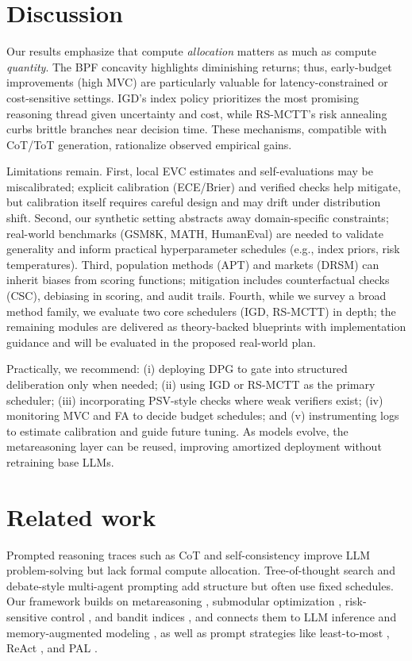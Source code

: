 \section{Discussion}

Our results emphasize that compute \emph{allocation} matters as much as compute \emph{quantity}. The BPF concavity highlights diminishing returns; thus, early-budget improvements (high MVC) are particularly valuable for latency-constrained or cost-sensitive settings. IGD’s index policy prioritizes the most promising reasoning thread given uncertainty and cost, while RS-MCTT’s risk annealing curbs brittle branches near decision time. These mechanisms, compatible with CoT/ToT generation, rationalize observed empirical gains.

Limitations remain. First, local EVC estimates and self-evaluations may be miscalibrated; explicit calibration (ECE/Brier) and verified checks help mitigate, but calibration itself requires careful design and may drift under distribution shift. Second, our synthetic setting abstracts away domain-specific constraints; real-world benchmarks (GSM8K, MATH, HumanEval) are needed to validate generality and inform practical hyperparameter schedules (e.g., index priors, risk temperatures). Third, population methods (APT) and markets (DRSM) can inherit biases from scoring functions; mitigation includes counterfactual checks (CSC), debiasing in scoring, and audit trails. Fourth, while we survey a broad method family, we evaluate two core schedulers (IGD, RS-MCTT) in depth; the remaining modules are delivered as theory-backed blueprints with implementation guidance and will be evaluated in the proposed real-world plan.

Practically, we recommend: (i) deploying DPG to gate into structured deliberation only when needed; (ii) using IGD or RS-MCTT as the primary scheduler; (iii) incorporating PSV-style checks where weak verifiers exist; (iv) monitoring MVC and FA to decide budget schedules; and (v) instrumenting logs to estimate calibration and guide future tuning. As models evolve, the metareasoning layer can be reused, improving amortized deployment without retraining base LLMs.

\section{Related work}
Prompted reasoning traces such as CoT \cite{wei2022cot} and self-consistency \cite{wang2023selfconsistency} improve LLM problem-solving but lack formal compute allocation. 
Tree-of-thought search \cite{yao2023tot} and debate-style multi-agent prompting \cite{irving2018debate} add structure but often use fixed schedules. Our framework builds on metareasoning \cite{russellwefald1991,horvitz1989,liedergriffiths2020}, submodular optimization \cite{nemhauser1978,golovin2011adaptive}, risk-sensitive control \cite{howard1972risk,ahmadi2012entropic}, and bandit indices \cite{gittins1979,whittle1988restless}, and connects them to LLM inference and memory-augmented modeling \cite{weston2015memnn,graves2016dnc,lewis2020rag}, as well as prompt strategies like least-to-most \cite{zhou2022leasttomost}, ReAct \cite{yao2022react}, and PAL \cite{gao2023pal}.


